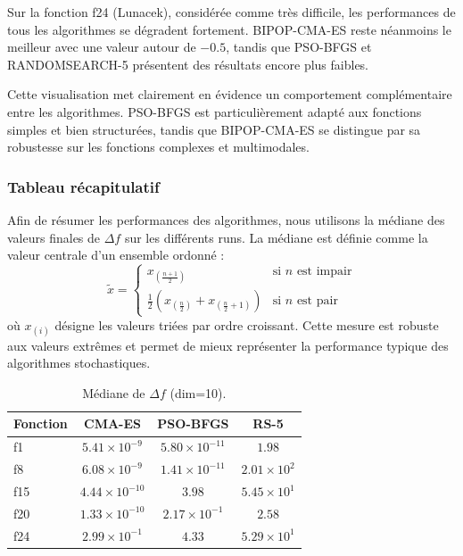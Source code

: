 \documentclass[conference]{IEEEtran}
\begin{document}
Sur la fonction f24 (Lunacek), consid\'er\'ee comme tr\`es difficile, les performances de tous les algorithmes se d\'egradent fortement. BIPOP-CMA-ES reste n\'eanmoins le meilleur avec une valeur autour de $-0.5$, tandis que PSO-BFGS et RANDOMSEARCH-5 pr\'esentent des r\'esultats encore plus faibles.

Cette visualisation met clairement en \'evidence un comportement compl\'ementaire entre les algorithmes. PSO-BFGS est particuli\`erement adapt\'e aux fonctions simples et bien structur\'ees, tandis que BIPOP-CMA-ES se distingue par sa robustesse sur les fonctions complexes et multimodales.

\subsubsection{Tableau r\'ecapitulatif}

Afin de r\'esumer les performances des algorithmes, nous utilisons la m\'ediane des valeurs finales de $\Delta f$ sur les diff\'erents runs. La m\'ediane est d\'efinie comme la valeur centrale d'un ensemble ordonn\'e :
\begin{equation}
\tilde{x} = \begin{cases}
x_{\left(\frac{n+1}{2}\right)} & \text{si } n \text{ est impair} \\[6pt]
\frac{1}{2}\left(x_{\left(\frac{n}{2}\right)} + x_{\left(\frac{n}{2}+1\right)}\right) & \text{si } n \text{ est pair}
\end{cases}
\end{equation}
o\`u $x_{(i)}$ d\'esigne les valeurs tri\'ees par ordre croissant. Cette mesure est robuste aux valeurs extr\^emes et permet de mieux repr\'esenter la performance typique des algorithmes stochastiques.

\begin{table}[H]
\centering
\caption{M\'ediane de $\Delta f$ (dim=10).}
\label{tab:median}
\begin{tabular}{lccc}
\toprule
Fonction & CMA-ES & PSO-BFGS & RS-5 \\
\midrule
f1  & $5.41 \times 10^{-9}$  & $5.80 \times 10^{-11}$ & $1.98$ \\
f8  & $6.08 \times 10^{-9}$  & $1.41 \times 10^{-11}$ & $2.01 \times 10^2$ \\
f15 & $4.44 \times 10^{-10}$ & $3.98$                  & $5.45 \times 10^1$ \\
f20 & $1.33 \times 10^{-10}$ & $2.17 \times 10^{-1}$   & $2.58$ \\
f24 & $2.99 \times 10^{-1}$  & $4.33$                  & $5.29 \times 10^1$ \\
\bottomrule
\end{tabular}
\end{table}
\end{document}
